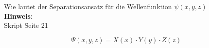 \begin{question}[section=2,name={Separationsansatz 2},difficulty=,quantity=1,type=thr,tags={20151210,20130314}]
	Wie lautet der Separationsansatz für die Wellenfunktion $\psi(x, y, z)$
	\\ \textbf{Hinweis:}\\
	Skript Seite 21
\end{question}
\begin{solution}
	\begin{equation}
		\Psi(x,y,z) = X(x) \cdot Y(y)\cdot Z(z)
	\end{equation}
\end{solution}